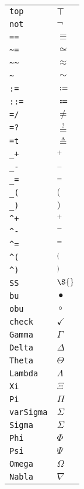 \begin{longtable}{ll}
\texttt{top}&${}\top {}$\\
\texttt{not}&${}\neg {}$\\
\texttt{==}&${}\equiv {}$\\
\texttt{\textasciitilde =}&${}\simeq {}$\\
\texttt{\textasciitilde \textasciitilde }&${}\approx {}$\\
\texttt{\textasciitilde }&${}\sim {}$\\
\texttt{:=}&${}\coloneqq {}$\\
\texttt{::=}&${}\Coloneqq {}$\\
\texttt{=/}&${}\neq {}$\\
\texttt{=?}&${}\stackrel{?}{=} {}$\\
\texttt{=t}&${}\triangleq {}$\\
\texttt{\_+}&${}_+ {}$\\
\texttt{\_{-}}&${}_- {}$\\
\texttt{\_=}&${}_= {}$\\
\texttt{\_(}&${}( {}$\\
\texttt{\_)}&${}) {}$\\
\texttt{\textasciicircum +}&${}^+ {}$\\
\texttt{\textasciicircum {-}}&${}^- {}$\\
\texttt{\textasciicircum =}&${}^= {}$\\
\texttt{\textasciicircum (}&${}^( {}$\\
\texttt{\textasciicircum )}&${}^) {}$\\
\texttt{SS}&${}\S {}$\\
\texttt{bu}&${}\bullet {}$\\
\texttt{obu}&${}\circ {}$\\
\texttt{check}&${}\checkmark {}$\\
\texttt{Gamma}&${}\Gamma {}$\\
\texttt{Delta}&${}\Delta {}$\\
\texttt{Theta}&${}\Theta {}$\\
\texttt{Lambda}&${}\Lambda {}$\\
\texttt{Xi}&${}\Xi {}$\\
\texttt{Pi}&${}\Pi {}$\\
\texttt{varSigma}&${}\varSigma {}$\\
\texttt{Sigma}&${}\Sigma {}$\\
\texttt{Phi}&${}\Phi {}$\\
\texttt{Psi}&${}\Psi {}$\\
\texttt{Omega}&${}\Omega {}$\\
\texttt{Nabla}&${}\nabla {}$\\

\end{longtable}
